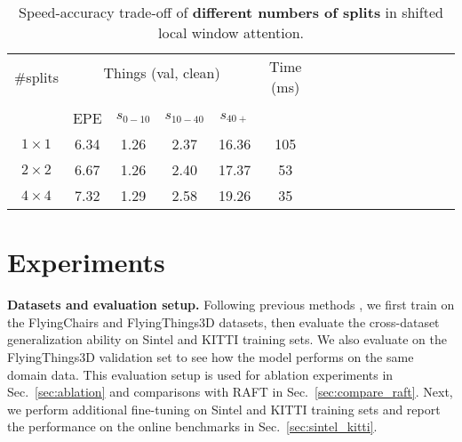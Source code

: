 \documentclass[10pt,twocolumn,letterpaper]{article}
\begin{document}
\begin{table}[t]
    \centering
    \setlength{\tabcolsep}{3.pt} %
    \begin{tabular}{cccccccccccccccc}
    \toprule
    
    \multirow{2}{*}[-2pt]{\#splits} & \multicolumn{4}{c}{Things (val, clean)}  &  \multirow{2}{*}[-2pt]{Time (ms)} \\
    \addlinespace[-12pt] \\
    \cmidrule(lr){2-5} 
    \addlinespace[-12pt] \\
    & EPE & $s_{0-10}$ & $s_{10-40}$ & $s_{40+}$  \\
    \midrule
    
    $1 \times 1$ & 6.34 & 1.26 & 2.37 & 16.36 & 105  \\
    $2 \times 2$ & 6.67 & 1.26 & 2.40 & 17.37 & 53 \\
    $4 \times 4$ & 7.32 & 1.29 & 2.58 & 19.26 & 35 \\

    \bottomrule
    \end{tabular}
    \vspace{-5pt}
    \caption{Speed-accuracy trade-off of \textbf{different numbers of splits} in shifted local window attention.
    }
    \label{tab:split_attn}
    \vspace{-10pt}
    
    
\end{table}





\section{Experiments}


{\bf Datasets and evaluation setup.} Following previous methods \cite{ilg2017flownet,sun2018pwc,teed2020raft}, we first train on the FlyingChairs \cite{dosovitskiy2015flownet} and FlyingThings3D \cite{mayer2016large} datasets, then evaluate the cross-dataset generalization ability on Sintel \cite{butler2012naturalistic} and KITTI \cite{menze2015object} training sets. We also evaluate on the FlyingThings3D validation set to see how the model performs on the same domain data. This evaluation setup is used for ablation experiments in Sec.~\ref{sec:ablation} and comparisons with RAFT in Sec.~\ref{sec:compare_raft}. Next, we perform additional fine-tuning on Sintel and KITTI training sets and report the performance on the online benchmarks in Sec.~\ref{sec:sintel_kitti}.
\end{document}
